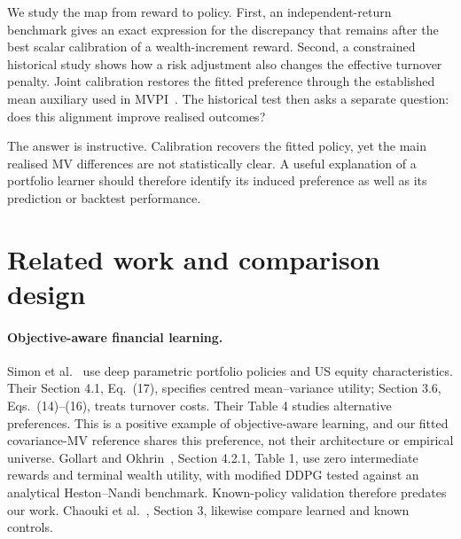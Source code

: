 \documentclass[sigconf,review]{acmart}
\begin{document}
We study the map from reward to policy. First, an independent-return benchmark gives an exact expression for the discrepancy that remains after the best scalar calibration of a wealth-increment reward. Second, a constrained historical study shows how a risk adjustment also changes the effective turnover penalty. Joint calibration restores the fitted preference through the established mean auxiliary used in MVPI\ \cite{zhang2021}. The historical test then asks a separate question: does this alignment improve realised outcomes?

The answer is instructive. Calibration recovers the fitted policy, yet the main realised MV differences are not statistically clear. A useful explanation of a portfolio learner should therefore identify its induced preference as well as its prediction or backtest performance.

\section{Related work and comparison design}
\paragraph{Objective-aware financial learning.}
Simon et al.\ \cite{simon2026} use deep parametric portfolio policies and US equity characteristics. Their Section 4.1, Eq.\ (17), specifies centred mean--variance utility; Section 3.6, Eqs.\ (14)--(16), treats turnover costs. Their Table 4 studies alternative preferences. This is a positive example of objective-aware learning, and our fitted covariance-MV reference shares this preference, not their architecture or empirical universe. Gollart and Okhrin\ \cite{gollart2025}, Section 4.2.1, Table 1, use zero intermediate rewards and terminal wealth utility, with modified DDPG tested against an analytical Heston--Nandi benchmark. Known-policy validation therefore predates our work. Chaouki et al.\ \cite{chaouki2020}, Section 3, likewise compare learned and known controls.
\end{document}
